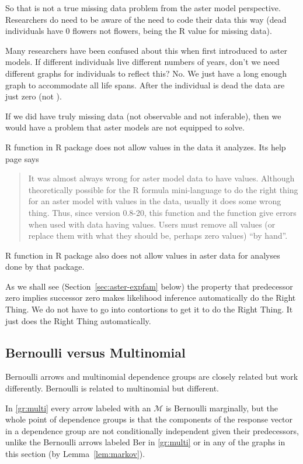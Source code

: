 So that is not a true missing data problem from the aster model perspective.
Researchers do need to be aware of the need to code their data this way
(dead individuals have 0 flowers not  flowers,  being
the R value for missing data).

Many researchers have been confused about this when first introduced to
aster models.  If different individuals live different numbers of years,
don't we need different graphs for individuals to reflect this?  No.
We just have a long enough graph to accommodate all life spans.  After
the individual is dead the data are just zero (not ).

If we did have truly missing data (not observable and not inferable),
then we would have a problem that aster models are not equipped to solve.

R function  in R package  does not allow 
values in the data it analyzes.  Its help page says
\begin{quotation}
     It was almost always wrong for aster model data to have 
     values. Although theoretically possible for the R formula
     mini-language to do the right thing for an aster model with 
     values in the data, usually it does some wrong thing.  Thus, since
     version 0.8-20, this function and the  function give
     errors when used with data having  values.  Users must remove
     all  values (or replace them with what they should be, perhaps
     zero values) ``by hand''.
\end{quotation}
R function  in R package  also does not
allow  values in aster data for analyses done by that package.

As we shall see (Section~\ref{sec:aster-expfam} below)
the property that predecessor zero implies successor zero
makes likelihood inference automatically do the Right Thing.
We do not have to go into contortions to get it to do the Right Thing.
It just does the Right Thing automatically.

\subsection{Bernoulli versus Multinomial}

Bernoulli arrows and multinomial dependence groups are closely related but
work differently.  Bernoulli is related to multinomial but different.

In \eqref{gr:multi} every arrow labeled with an $\mathcal{M}$ is Bernoulli
marginally, but the whole point of dependence groups is that the components
of the response vector in a dependence group are not
conditionally independent given their predecessors, unlike the Bernoulli
arrows labeled Ber in \eqref{gr:multi} or in any of the graphs in this
section (by Lemma~\ref{lem:markov}).

